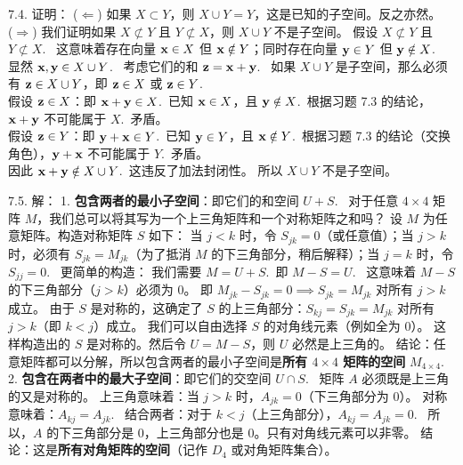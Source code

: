 \begin{exer}
7.4. 证明：
($\Leftarrow$) 如果 $X \subset Y$，则 $X \cup Y = Y$，这是已知的子空间。反之亦然。
\\
($\Rightarrow$) 我们证明如果 $X \not\subset Y$ 且 $Y \not\subset X$，则 $X \cup Y$ 不是子空间。
假设 $X \not\subset Y$ 且 $Y \not\subset X$.~
这意味着存在向量 $\mathbf{x} \in X$ 但 $\mathbf{x} \notin Y$；同时存在向量 $\mathbf{y} \in Y$ 但 $\mathbf{y} \notin X$.~
显然 $\mathbf{x}, \mathbf{y} \in X \cup Y$.~
考虑它们的和 $\mathbf{z} = \mathbf{x} + \mathbf{y}$.~
如果 $X \cup Y$ 是子空间，那么必须有 $\mathbf{z} \in X \cup Y$，即 $\mathbf{z} \in X$ 或 $\mathbf{z} \in Y$.~\\
假设 $\mathbf{z} \in X$：即 $\mathbf{x} + \mathbf{y} \in X$.~已知 $\mathbf{x} \in X$，且 $\mathbf{y} \notin X$.~根据习题 7.3 的结论，$\mathbf{x} + \mathbf{y}$ 不可能属于 $X$.~矛盾。\\
假设 $\mathbf{z} \in Y$：即 $\mathbf{y} + \mathbf{x} \in Y$.~已知 $\mathbf{y} \in Y$，且 $\mathbf{x} \notin Y$.~根据习题 7.3 的结论（交换角色），$\mathbf{y} + \mathbf{x}$ 不可能属于 $Y$.~矛盾。
\\
因此 $\mathbf{x} + \mathbf{y} \notin X \cup Y$.~这违反了加法封闭性。
所以 $X \cup Y$ 不是子空间。

7.5. 解：
1. \textbf{包含两者的最小子空间}：即它们的和空间 $U + S$.~
   对于任意 $4 \times 4$ 矩阵 $M$，我们总可以将其写为一个上三角矩阵和一个对称矩阵之和吗？
   设 $M$ 为任意矩阵。构造对称矩阵 $S$ 如下：
   当 $j < k$ 时，令 $S_{jk} = 0$（或任意值）；当 $j > k$ 时，必须有 $S_{jk} = M_{jk}$（为了抵消 $M$ 的下三角部分，稍后解释）；当 $j=k$ 时，令 $S_{jj} = 0$.~
   更简单的构造：
   我们需要 $M = U + S$.~即 $M - S = U$.~
   这意味着 $M - S$ 的下三角部分（$j > k$）必须为 0。
   即 $M_{jk} - S_{jk} = 0 \implies S_{jk} = M_{jk}$ 对所有 $j > k$ 成立。
   由于 $S$ 是对称的，这确定了 $S$ 的上三角部分：$S_{kj} = S_{jk} = M_{jk}$ 对所有 $j > k$（即 $k < j$）成立。
   我们可以自由选择 $S$ 的对角线元素（例如全为 0）。
   这样构造出的 $S$ 是对称的。然后令 $U = M - S$，则 $U$ 必然是上三角的。
   结论：任意矩阵都可以分解，所以包含两者的最小子空间是\textbf{所有 $4 \times 4$ 矩阵的空间} $M_{4 \times 4}$.~
\\
2. \textbf{包含在两者中的最大子空间}：即它们的交空间 $U \cap S$.~
   矩阵 $A$ 必须既是上三角的又是对称的。
   上三角意味着：当 $j > k$ 时，$A_{jk} = 0$（下三角部分为 0）。
   对称意味着：$A_{kj} = A_{jk}$.~
   结合两者：对于 $k < j$（上三角部分），$A_{kj} = A_{jk} = 0$.~
   所以，$A$ 的下三角部分是 0，上三角部分也是 0。只有对角线元素可以非零。
   结论：这是\textbf{所有对角矩阵的空间}（记作 $D_4$ 或对角矩阵集合）。

\vspace{5ex}



\end{exer}
